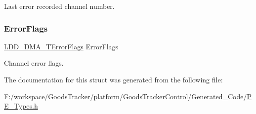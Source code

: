 Last error recorded channel number. \mbox{\label{struct_l_d_d___d_m_a___t_error_ac719f5f56edcf8607505829469fa6eb1}} 
\subsubsection{\texorpdfstring{Error\+Flags}{ErrorFlags}}
{\footnotesize\ttfamily \hyperlink{group___p_e___types__module_gaea6d9250a094d0f060ae12a0b7abb474}{L\+D\+D\+\_\+\+D\+M\+A\+\_\+\+T\+Error\+Flags} Error\+Flags}

Channel error flags. 

The documentation for this struct was generated from the following file\+:\begin{DoxyCompactItemize}
\item 
F\+:/workspace/\+Goods\+Tracker/platform/\+Goods\+Tracker\+Control/\+Generated\+\_\+\+Code/\hyperlink{_p_e___types_8h}{P\+E\+\_\+\+Types.\+h}\end{DoxyCompactItemize}
